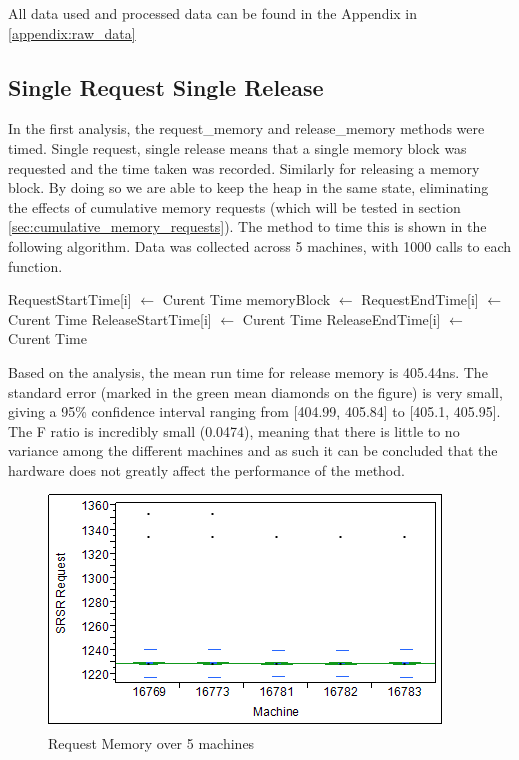 \documentclass[12pt]{report}
\begin{document}
\par All data used and processed data can be found in the Appendix in \ref{appendix:raw_data}

\subsection{Single Request Single Release}
\label{sec:single_request_single_release}
In the first analysis, the request\_memory and release\_memory methods were timed. Single request, single release means that a single memory block was requested and the time taken was recorded. Similarly for releasing a memory block. By doing so we are able to keep the heap in the same state, eliminating the effects of cumulative memory requests (which will be tested in section \ref{sec:cumulative_memory_requests}). The method to time this is shown in the following algorithm. Data was collected across 5 machines, with 1000 calls to each function.

\begin{algorithmic}
      \State RequestStartTime[i] $\gets$ Curent Time
      \State memoryBlock $\gets$  
      \State RequestEndTime[i] $\gets$ Curent Time
      \State ReleaseStartTime[i] $\gets$ Curent Time
      \State {}
      \State ReleaseEndTime[i] $\gets$ Curent Time
    \EndFor
  \EndFunction
\end{algorithmic}

Based on the analysis, the mean run time for release memory is 405.44ns. The standard error (marked in the green mean diamonds on the figure) is very small, giving a 95\% confidence interval ranging from [404.99, 405.84] to [405.1, 405.95]. The F ratio is incredibly small (0.0474), meaning that there is little to no variance among the different machines and as such it can be concluded that the hardware does not greatly affect the performance of the method.

\begin{figure}[h!]
  \centering
    \includegraphics{SRSRRequestMemory.png}
  \caption{Request Memory over 5 machines}
\end{figure}
\end{document}
